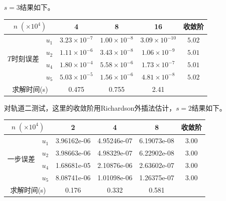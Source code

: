 \documentclass[lang=cn,10pt,bibend=bibtex]{elegantbook}
\begin{document}
$s=3$结果如下。

\vspace{-.5em}
\begin{table}[H]
  \centering
  \renewcommand\arraystretch{0.8}
  \begin{tabular}{cc|ccc|c}
  \multicolumn{2}{c|}{$n\;(\times 10^4)$}                  & 4 & 8 & 16  & 收敛阶 \\ \hline
  \multicolumn{1}{c|}{\multirow{4}{*}{$T$时刻误差}} & \multicolumn{1}{c|}{$u_1$} &  $3.23\times 10^{-7}$  & $1.00\times 10^{-8}$  & $3.09\times 10^{-10}$    &  $5.02$   \\
  \multicolumn{1}{c|}{}                         & \multicolumn{1}{c|}{$u_2$} &  $1.11\times 10^{-6}$     & $3.43\times 10^{-8}$  & $1.06\times 10^{-9}$    &  $5.01$   \\
  \multicolumn{1}{c|}{}                         & \multicolumn{1}{c|}{$u_4$} &  $1.80\times 10^{-4}$     & $5.58\times 10^{-6}$  & $1.73\times 10^{-7}$     &  $5.01$   \\
  \multicolumn{1}{c|}{}                         & \multicolumn{1}{c|}{$u_5$} &  $5.03\times 10^{-5}$     & $1.56\times 10^{-6}$  & $4.81\times 10^{-8}$     &  $5.02$  \\ \hline
  \multicolumn{2}{c|}{求解时间(s)} & 0.475 & 0.755 & 2.41 & 
  \end{tabular}
\end{table}
\vspace{-.5em}

对轨道二测试，这里的收敛阶用Richardson外插法估计，$s=2$结果如下。

\vspace{-.5em}
\begin{table}[H]
  \centering
  \renewcommand\arraystretch{0.8}
  \begin{tabular}{cc|ccc|c}
  \multicolumn{2}{c|}{$n\;(\times 10^4)$}                         & 2 & 4 & 8 & 收敛阶 \\ \hline
  \multicolumn{1}{c|}{\multirow{4}{*}{一步误差}}    & \multicolumn{1}{c|}{$u_1$} & 3.96162e-06  & 4.95246e-07  & 6.19073e-08   &   $3.00$  \\
  \multicolumn{1}{c|}{}                         & \multicolumn{1}{c|}{$u_2$} &  3.98663e-06    & 4.98329e-07  & 6.22902e-08    &  $3.00$   \\
  \multicolumn{1}{c|}{}                         & \multicolumn{1}{c|}{$u_4$} &  1.68681e-05    & 2.10876e-06  & 2.63602e-07   & $3.00$ \\
  \multicolumn{1}{c|}{}                         & \multicolumn{1}{c|}{$u_5$} &  8.08741e-06    & 1.01098e-06  & 1.26375e-07   & $3.00$  \\ \hline
  \multicolumn{2}{c|}{求解时间(s)} & 0.176 & 0.332 & 0.581 &   
  \end{tabular}
\end{table}
\vspace{-.5em}
\end{document}
